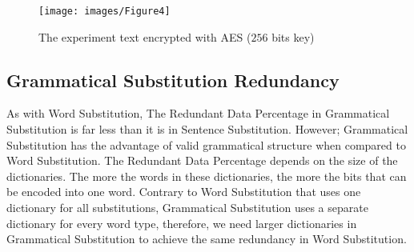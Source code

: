\documentclass{acm_proc_article-sp}
\begin{document}
\begin{figure}
  \centering
  \texttt{[image: images/Figure4]}
  \caption{The experiment text encrypted with AES ($256$ bits key)}\label{The-experiment-text-encrypted-with-AES}
\end{figure}

\subsection{Grammatical Substitution Redundancy}\label{Grammatical-Substitution-Redundancy}
As with Word Substitution, The Redundant Data Percentage in Grammatical Substitution is far less than it is in Sentence Substitution. However; Grammatical Substitution has the advantage of valid grammatical structure when compared to Word Substitution. The Redundant Data Percentage depends on the size of the dictionaries. The more the words in these dictionaries, the more the bits that can be encoded into one word. Contrary to Word Substitution that uses one dictionary for all substitutions, Grammatical Substitution uses a separate dictionary for every word type, therefore, we need larger dictionaries in Grammatical Substitution to achieve the same redundancy in Word Substitution.
\end{document}
